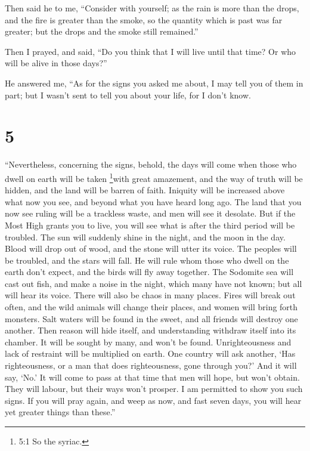  Then said he to me, ``Consider with yourself; as the rain
is more than the drops, and the fire is greater than the smoke, so the
quantity which is past was far greater; but the drops and the smoke
still remained.''

 Then I prayed, and said, ``Do you think that I will live
until that time? Or who will be alive in those days?''

 He answered me, ``As for the signs you asked me about, I
may tell you of them in part; but I wasn't sent to tell you about your
life, for I don't know.

\hypertarget{section-4}{%
\section{5}\label{section-4}}

 ``Nevertheless, concerning the signs, behold, the days will
come when those who dwell on earth will be taken \footnote{5:1 So the
  syriac.}with great amazement, and the way of truth will be hidden, and
the land will be barren of faith.  Iniquity will be
increased above what now you see, and beyond what you have heard long
ago.  The land that you now see ruling will be a trackless
waste, and men will see it desolate.  But if the Most High
grants you to live, you will see what is after the third period will be
troubled. The sun will suddenly shine in the night, and the moon in the
day.  Blood will drop out of wood, and the stone will utter
its voice. The peoples will be troubled, and the stars will fall.
 He will rule whom those who dwell on the earth don't
expect, and the birds will fly away together.  The Sodomite
sea will cast out fish, and make a noise in the night, which many have
not known; but all will hear its voice.  There will also be
chaos in many places. Fires will break out often, and the wild animals
will change their places, and women will bring forth monsters.
 Salt waters will be found in the sweet, and all friends
will destroy one another. Then reason will hide itself, and
understanding withdraw itself into its chamber.  It will be
sought by many, and won't be found. Unrighteousness and lack of
restraint will be multiplied on earth.  One country will
ask another, `Has righteousness, or a man that does righteousness, gone
through you?' And it will say, `No.'  It will come to pass
at that time that men will hope, but won't obtain. They will labour, but
their ways won't prosper.  I am permitted to show you such
signs. If you will pray again, and weep as now, and fast seven days, you
will hear yet greater things than these.''

